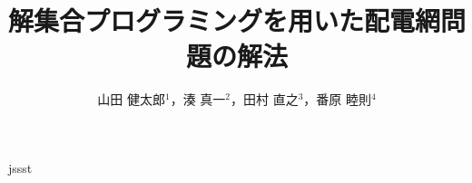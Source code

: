 \documentclass[japanese,dvipdfmx]{jssst_ppl} %
\title{解集合プログラミングを用いた配電網問題の解法}
\author{山田 健太郎$^1$，湊 真一$^2$，田村 直之$^3$，番原 睦則$^4$}
\begin{document}
\maketitle
\begin{abstract}

\end{abstract}









 {jssst}
\end{document}
